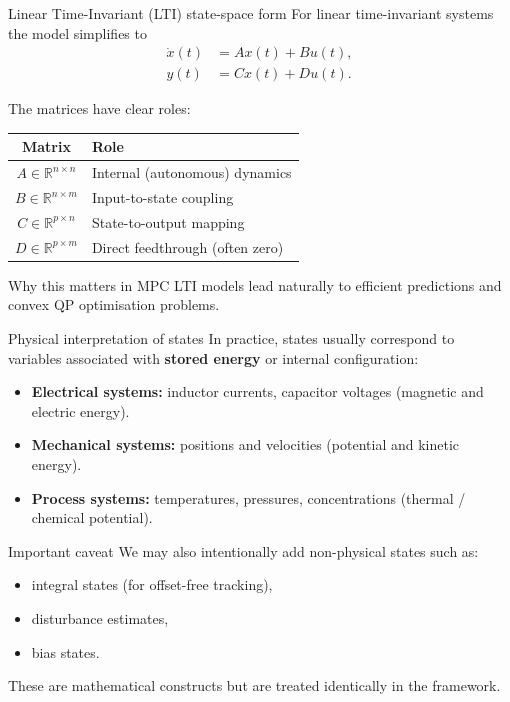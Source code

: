 \documentclass[aspectratio=169,10pt]{beamer}
\newcommand{\R}{\mathbb{R}}
\begin{document}
\begin{frame}{Linear Time-Invariant (LTI) state-space form}
For linear time-invariant systems the model simplifies to
\begin{align*}
\dot{x}(t) &= Ax(t)+Bu(t),\\
y(t) &= Cx(t)+Du(t).
\end{align*}

The matrices have clear roles:
\begin{center}
\renewcommand{\arraystretch}{1.25}
\begin{tabular}{cl}
\toprule
Matrix & Role \\ \midrule
$A\in\R^{n\times n}$ & Internal (autonomous) dynamics \\
$B\in\R^{n\times m}$ & Input-to-state coupling \\
$C\in\R^{p\times n}$ & State-to-output mapping \\
$D\in\R^{p\times m}$ & Direct feedthrough (often zero) \\
\bottomrule
\end{tabular}
\end{center}

\begin{notebox}{Why this matters in MPC}
LTI models lead naturally to efficient predictions and convex QP
optimisation problems.
\end{notebox}
\end{frame}

\begin{frame}{Physical interpretation of states}
In practice, states usually correspond to variables associated with
\textbf{stored energy} or internal configuration:
\begin{itemize}
  \item \textbf{Electrical systems:} inductor currents, capacitor voltages
        (magnetic and electric energy).
  \item \textbf{Mechanical systems:} positions and velocities
        (potential and kinetic energy).
  \item \textbf{Process systems:} temperatures, pressures, concentrations
        (thermal / chemical potential).
\end{itemize}

\begin{notebox}{Important caveat}
We may also intentionally add non-physical states such as:
\begin{itemize}
  \item integral states (for offset-free tracking),
  \item disturbance estimates,
  \item bias states.
\end{itemize}
These are mathematical constructs but are treated identically in the framework.
\end{notebox}
\end{frame}
\end{document}
